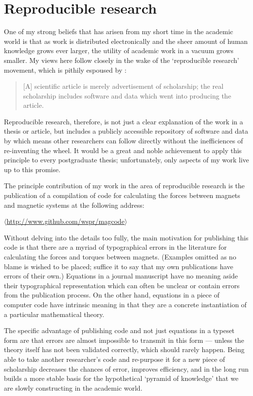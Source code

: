 \chapter{Reproducible research}
\label{repro-research}

One of my strong beliefs that has arisen from my short time in the academic world is that as work is distributed electronically and the sheer amount of human knowledge grows ever larger, the utility of academic work in a vacuum grows smaller.
My views here follow closely in the wake of the `reproducible research' movement, which is pithily espoused by \textcite{kovacevic2007-icassp}:
\begin{quote}
\textup [A\textup] scientific article is merely advertisement of scholarship; the real scholarship includes software and data which went into producing the article.
\end{quote}
Reproducible research, therefore, is not just a clear explanation of the work in a thesis or article, but includes a publicly accessible repository of software and data by which means other researchers can follow directly without the inefficiences of re-inventing the wheel.
It would be a great and noble achievement to apply this principle to every postgraduate thesis; unfortunately, only aspects of my work live up to this promise.

The principle contribution of my work in the area of reproducible research is the publication of a compilation of code for calculating the forces between magnets and magnetic systems at the following address:\\
\centerline{$\langle$\url{http://www.github.com/wspr/magcode}$\rangle$}

Without delving into the details too fully, the main motivation for publishing this code is that there are a myriad of typographical errors in the literature for calculating the forces and torques between magnets.
(Examples omitted as no blame is wished to be placed; suffice it to say that my own publications have errors of their own.)
Equations in a journal manuscript have no meaning aside their typographical representation which can often be unclear or contain errors from the publication process.
On the other hand, equations in a piece of computer code have intrinsic meaning in that they are a concrete instantiation of a particular mathematical theory.

The specific advantage of publishing code and not just equations in a typeset form are that errors are almost impossible to transmit in this form — unless the theory itself has not been validated correctly, which should rarely happen.
Being able to take another researcher's code and re-purpose it for a new piece of scholarship decreases the chances of error, improves efficiency, and in the long run builds a more stable basis for the hypothetical `pyramid of knowledge' that we are slowly constructing in the academic world.

